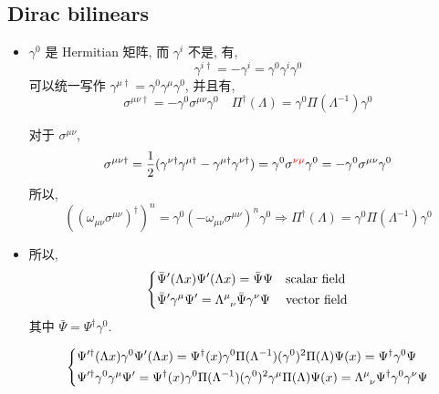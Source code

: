 \subsection{Dirac bilinears}
\begin{itemize}
	\item $\gamma^0$ 是 Hermitian 矩阵, 而 $\gamma^i$ 不是, 有,
	\begin{equation} \label{6.2.15}
		\gamma^{i \dag} = - \gamma^i = \gamma^0 \gamma^i \gamma^0
	\end{equation}
	可以统一写作 $\gamma^{\mu \dag} = \gamma^0 \gamma^\mu \gamma^0$, 并且有,
	\begin{equation}
		\sigma^{\mu \nu \dag} = - \gamma^0 \sigma^{\mu \nu} \gamma^0 \quad \Pi^\dag(\Lambda) = \gamma^0 \Pi(\Lambda^{- 1}) \gamma^0
	\end{equation}
	
	\begin{tcolorbox}[title=calculation:]
		对于 $\sigma^{\mu \nu}$,
		\begin{equation}
			\sigma^{\mu \nu \dag} = \frac{1}{2} (\gamma^{\nu \dag} \gamma^{\mu \dag} - \gamma^{\mu \dag} \gamma^{\nu \dag}) = \gamma^0 \sigma^{\mathcolor{red}{\nu \mu}} \gamma^0 = - \gamma^0 \sigma^{\mu \nu} \gamma^0
		\end{equation}
		所以,
		\begin{equation}
			((\omega_{\mu \nu} \sigma^{\mu \nu})^\dag)^n = \gamma^0 (- \omega_{\mu \nu} \sigma^{\mu \nu})^n \gamma^0 \Longrightarrow \Pi^\dag(\Lambda) = \gamma^0 \Pi(\Lambda^{- 1}) \gamma^0
		\end{equation}
	\end{tcolorbox}
	
	\item 所以,
	\begin{equation} \label{6.2.19}
		\begin{dcases}
			\bar{\Psi}'(\Lambda x) \Psi'(\Lambda x) = \bar{\Psi} \Psi & \text{scalar field} \\
			\bar{\Psi}' \gamma^\mu \Psi' = \tensor{\Lambda}{^\mu_\nu} \bar{\Psi} \gamma^\nu \Psi & \text{vector field}
		\end{dcases}
	\end{equation}
	其中 $\bar{\Psi} = \Psi^\dag \gamma^0$.
	
	\begin{tcolorbox}[title=calculation:]
		\begin{equation}
			\begin{dcases}
				\Psi'^\dag(\Lambda x) \gamma^0 \Psi'(\Lambda x) = \Psi^\dag(x) \gamma^0 \Pi(\Lambda^{- 1}) (\gamma^0)^2 \Pi(\Lambda) \Psi(x) = \Psi^\dag \gamma^0 \Psi \\
				\Psi'^\dag \gamma^0 \gamma^\mu \Psi' = \Psi^\dag(x) \gamma^0 \Pi(\Lambda^{- 1}) (\gamma^0)^2 \gamma^\mu \Pi(\Lambda) \Psi(x) = \tensor{\Lambda}{^\mu_\nu} \Psi^\dag \gamma^0 \gamma^\nu \Psi
			\end{dcases}
		\end{equation}
		

\end{tcolorbox}
\end{itemize}
